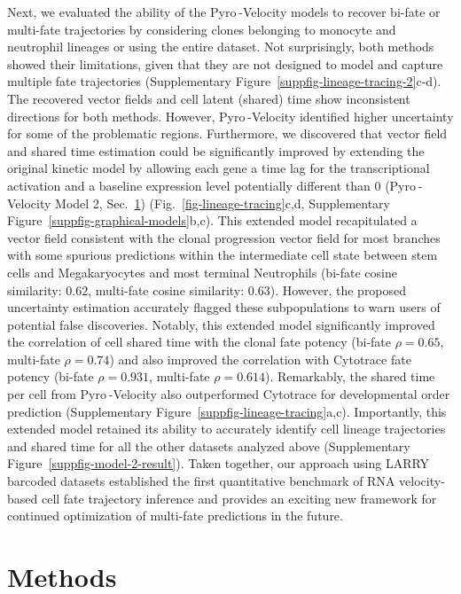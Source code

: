 \documentclass[
  sn-mathphys-num,
  lineno,
  twocolumn]{sn-jnl}
\begin{document}
Next, we evaluated the ability of the Pyro -Velocity models to recover
bi-fate or multi-fate trajectories by considering clones belonging to
monocyte and neutrophil lineages or using the entire dataset. Not
surprisingly, both methods showed their limitations, given that they are
not designed to model and capture multiple fate trajectories
(Supplementary Figure~\ref{suppfig-lineage-tracing-2}c-d). The recovered
vector fields and cell latent (shared) time show inconsistent directions
for both methods. However, Pyro -Velocity identified higher uncertainty
for some of the problematic regions. Furthermore, we discovered that
vector field and shared time estimation could be significantly improved
by extending the original kinetic model by allowing each gene a time lag
for the transcriptional activation and a baseline expression level
potentially different than 0 (Pyro -Velocity Model 2,
Sec.~\ref{sec-methods}) (Fig.~\ref{fig-lineage-tracing}c,d,
Supplementary Figure~\ref{suppfig-graphical-models}b,c). This extended
model recapitulated a vector field consistent with the clonal
progression vector field for most branches with some spurious
predictions within the intermediate cell state between stem cells and
Megakaryocytes and most terminal Neutrophils (bi-fate cosine similarity:
\(0.62\), multi-fate cosine similarity: \(0.63\)). However, the proposed
uncertainty estimation accurately flagged these subpopulations to warn
users of potential false discoveries. Notably, this extended model
significantly improved the correlation of cell shared time with the
clonal fate potency (bi-fate \(\rho=0.65\), multi-fate \(\rho=0.74\))
and also improved the correlation with Cytotrace fate potency (bi-fate
\(\rho=0.931\), multi-fate \(\rho=0.614\)). Remarkably, the shared time
per cell from Pyro -Velocity also outperformed Cytotrace for
developmental order prediction
(Supplementary Figure~\ref{suppfig-lineage-tracing}a,c). Importantly,
this extended model retained its ability to accurately identify cell
lineage trajectories and shared time for all the other datasets analyzed
above (Supplementary Figure~\ref{suppfig-model-2-result}). Taken
together, our approach using LARRY barcoded datasets established the
first quantitative benchmark of RNA velocity-based cell fate trajectory
inference and provides an exciting new framework for continued
optimization of multi-fate predictions in the future.

\section{Methods}\label{sec-methods}
\end{document}

